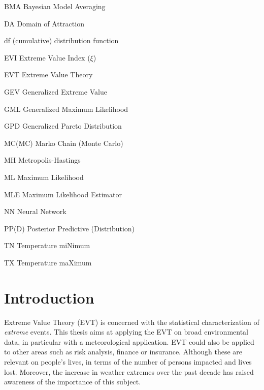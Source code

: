 \documentclass[11pt,a4paper,openany, twosided]{book}
\newcommand{\abbrlabel}[1]{\makebox[3cm][l]{\textbf{#1}\ \dotfill}}
\newenvironment{abbreviations}{\begin{list}{}{\renewcommand{\makelabel}{\abbrlabel}}}{\end{list}}
\newcommand\blankpage{%
    \null
    \thispagestyle{empty}%
    \addtocounter{page}{-1}%
    \newpage}
\begin{document}
\begin{center}
\begin{abbreviations}
	\item[BMA] Bayesian Model Averaging
	\item[DA] Domain of Attraction
	\item[df]\label{df}  (cumulative) distribution function
	\item[EVI] Extreme Value Index ($\xi$)
	\item[EVT] Extreme Value Theory
	\item[GEV] Generalized Extreme Value
	\item[GML] Generalized Maximum Likelihood
	\item[GPD] Generalized Pareto Distribution %
	\item[MC(MC)] Marko Chain (Monte Carlo)
	\item[MH] Metropolis-Hastings 
	\item[ML] Maximum Likelihood 
	\item[MLE] Maximum Likelihood Estimator
	\item[NN] Neural Network
	\item[PP(D)] Posterior Predictive (Distribution)
	\item[TN] Temperature miNimum
	\item[TX] Temperature maXimum
	
\end{abbreviations}
\end{center}


\renewcommand\labelitemi{\normalsize$\bullet$}



\afterpage{\blankpage}


\chapter*{Introduction}
\thispagestyle{empty}


Extreme Value Theory (EVT) is concerned with the statistical characterization of \emph{extreme} events. 
This thesis aims at applying the EVT on broad environmental data, in particular with a meteorological application. EVT could also be applied to other areas such as risk analysis, finance or insurance. Although these are relevant on people's lives, in terms of the number of persons impacted and lives lost.
Moreover, the increase in weather extremes over the past decade has raised awareness of the importance of this subject.
\end{document}
